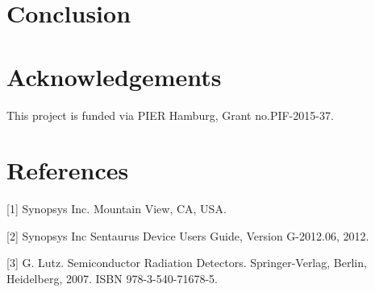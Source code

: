\documentclass[a4paper,10pt]{article}
\newcommand*{\notFOREPJ}{}%
\begin{document}
\section{Conclusion}
\label{sec:conclusion}
\ifdefined\notFOREPJ
 
\else
 
\fi

\section*{Acknowledgements}
This project is funded via PIER Hamburg, Grant no.PIF-2015-37.

{\small
\section*{References}

[1] Synopsys Inc. Mountain View, CA, USA.

[2] Synopsys Inc Sentaurus Device Users Guide, Version G-2012.06, 2012.

[3] G. Lutz. Semiconductor Radiation Detectors. Springer-Verlag, Berlin, Heidelberg, 2007. ISBN 978-3-540-71678-5.




\ifdefined\notFOREPJ

\else

\fi
}
\end{document}
